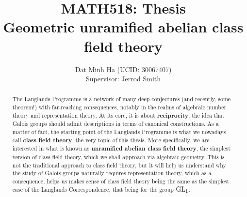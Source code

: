 
\setcounter{section}{-1}





	\title{\textbf{MATH518: Thesis
	\\
	Geometric unramified abelian class field theory}}
	
	\author{Dat Minh Ha (UCID: 30067407)\\Supervisor: Jerrod Smith}
	\maketitle
	
	\begin{abstract}
	    The Langlands Programme is a network of many deep conjectures (and recently, some theorem!) with far-reaching consequences, notably in the realms of algebraic number theory and representation theory. At its core, it is about \textbf{reciprocity}, the idea that Galois groups should admit descriptions in terms of canonical constructions. As a matter of fact, the starting point of the Langlands Programme is what we nowadays call \textbf{class field theory}, the very topic of this thesis. More specifically, we are interested in what is known as \textbf{unramified abelian class field theory}, the simplest version of class field theory, which we shall approach via algebraic geometry. This is not the traditional approach to class field theory, but it will help us understand why the study of Galois groups naturally requires representation theory, which as a consequence, helps us makes sense of class field theory being the same as the simplest case of the Langlands Correspondence, that being for the group $\operatorname{GL}_1$.
	\end{abstract}
	
	{
      \hypersetup{} 
      \tableofcontents %
    }
    
    
    
    
    
    
	
	\printbibliography


